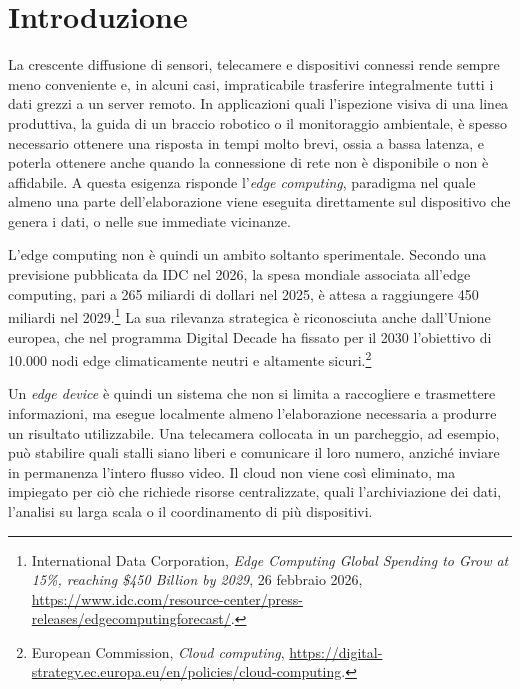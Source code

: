 
\section{Introduzione}

La crescente diffusione di sensori, telecamere e dispositivi connessi rende sempre meno conveniente e, in alcuni casi, impraticabile trasferire integralmente tutti i dati grezzi a un server remoto. In applicazioni quali l'ispezione visiva di una linea produttiva, la guida di un braccio robotico o il monitoraggio ambientale, è spesso necessario ottenere una risposta in tempi molto brevi, ossia a bassa latenza, e poterla ottenere anche quando la connessione di rete non è disponibile o non è affidabile. A questa esigenza risponde l'\emph{edge computing}, paradigma nel quale almeno una parte dell'elaborazione viene eseguita direttamente sul dispositivo che genera i dati, o nelle sue immediate vicinanze.

L'edge computing non è quindi un ambito soltanto sperimentale. Secondo una previsione pubblicata da IDC nel 2026, la spesa mondiale associata all'edge computing, pari a 265 miliardi di dollari nel 2025, è attesa a raggiungere 450 miliardi nel 2029.\footnote{International Data Corporation, \emph{Edge Computing Global Spending to Grow at 15\%, reaching \$450 Billion by 2029}, 26 febbraio 2026, \url{https://www.idc.com/resource-center/press-releases/edgecomputingforecast/}.} La sua rilevanza strategica è riconosciuta anche dall'Unione europea, che nel programma Digital Decade ha fissato per il 2030 l'obiettivo di 10.000 nodi edge climaticamente neutri e altamente sicuri.\footnote{European Commission, \emph{Cloud computing}, \url{https://digital-strategy.ec.europa.eu/en/policies/cloud-computing}.}

Un \emph{edge device} è quindi un sistema che non si limita a raccogliere e trasmettere informazioni, ma esegue localmente almeno l'elaborazione necessaria a produrre un risultato utilizzabile. Una telecamera collocata in un parcheggio, ad esempio, può stabilire quali stalli siano liberi e comunicare il loro numero, anziché inviare in permanenza l'intero flusso video. Il cloud non viene così eliminato, ma impiegato per ciò che richiede risorse centralizzate, quali l'archiviazione dei dati, l'analisi su larga scala o il coordinamento di più dispositivi.

